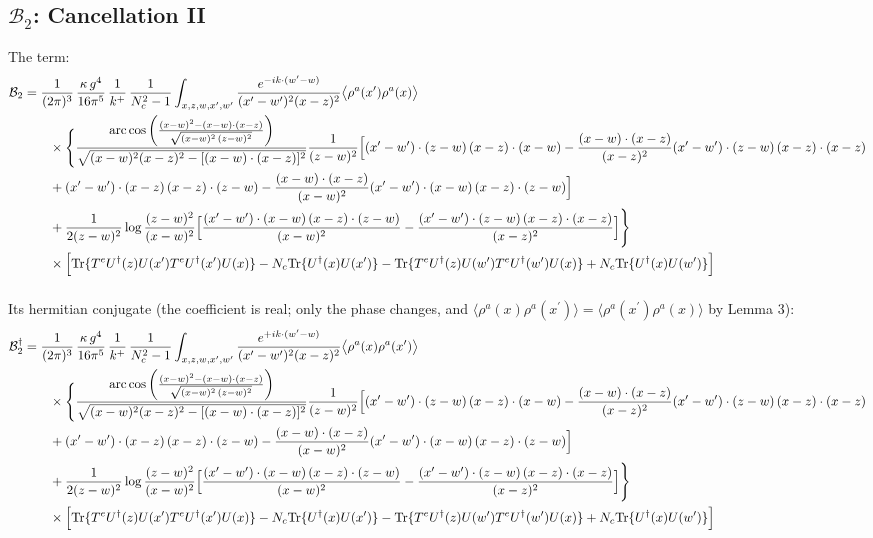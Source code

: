 \documentclass[10pt]{article}
\begin{document}
\subsection*{$\mathcal{B}_{2}$: Cancellation II}
\noindent The term:
\begin{align}
\mathcal{B}_{2}&=\frac{1}{(2\pi)^{3}}\,\frac{\kappa\,g^{4}}{16\pi^{5}}\,\frac{1}{k^{+}}\,\frac{1}{N_{c}^{2}-1}\int_{x,z,w,x',w'}\frac{e^{-ik\cdot(w'-w)}}{(x'-w')^{2}(x-z)^{2}}\big\langle\rho^{a}(x')\rho^{a}(x)\big\rangle\notag\\
&\qquad\times\Bigg\{\frac{\mathrm{arc\,cos}\left(\frac{(x-w)^{2}-(x-w)\cdot (x-z)}{\sqrt{(x-w)^{2}\,(z-w)^{2}}}\right)}{\sqrt{(x-w)^{2}(x-z)^{2}-[(x-w)\cdot(x-z)]^{2}}}\frac{1}{(z-w)^{2}}\Big[(x'-w')\cdot(z-w)\,(x-z)\cdot(x-w)-\frac{(x-w)\cdot(x-z)}{(x-z)^{2}}(x'-w')\cdot(z-w)\,(x-z)\cdot(x-z)\notag\\
&\qquad+(x'-w')\cdot(x-z)\,(x-z)\cdot(z-w)-\frac{(x-w)\cdot(x-z)}{(x-w)^{2}}(x'-w')\cdot(x-w)\,(x-z)\cdot(z-w)\Big]\notag\\
&\qquad+\frac{1}{2(z-w)^{2}}\log\frac{(z-w)^{2}}{(x-w)^{2}}\Big[\frac{(x'-w')\cdot(x-w)\,(x-z)\cdot(z-w)}{(x-w)^{2}}-\frac{(x'-w')\cdot(z-w)\,(x-z)\cdot(x-z)}{(x-z)^{2}}\Big]\Bigg\}\notag\\
&\qquad\times\Big[{\rm Tr}\{T^{e}U^{\dagger}(z)U(x')T^{e}U^{\dagger}(x')U(x)\}-N_{c}{\rm Tr}\{U^{\dagger}(x)U(x')\}-{\rm Tr}\{T^{e}U^{\dagger}(z)U(w')T^{e}U^{\dagger}(w')U(x)\}+N_{c}{\rm Tr}\{U^{\dagger}(x)U(w')\}\Big]\notag\\[6pt]
\end{align}

\noindent Its hermitian conjugate (the coefficient is real; only the phase changes, and $\langle\rho^{a}(x)\rho^{a}(x^{\prime})\rangle=\langle\rho^{a}(x^{\prime})\rho^{a}(x)\rangle$ by Lemma 3):
\begin{align}
\mathcal{B}_{2}^{\dagger}&=\frac{1}{(2\pi)^{3}}\,\frac{\kappa\,g^{4}}{16\pi^{5}}\,\frac{1}{k^{+}}\,\frac{1}{N_{c}^{2}-1}\int_{x,z,w,x',w'}\frac{e^{+ik\cdot(w'-w)}}{(x'-w')^{2}(x-z)^{2}}\big\langle\rho^{a}(x)\rho^{a}(x')\big\rangle\notag\\
&\qquad\times\Bigg\{\frac{\mathrm{arc\,cos}\left(\frac{(x-w)^{2}-(x-w)\cdot (x-z)}{\sqrt{(x-w)^{2}\,(z-w)^{2}}}\right)}{\sqrt{(x-w)^{2}(x-z)^{2}-[(x-w)\cdot(x-z)]^{2}}}\frac{1}{(z-w)^{2}}\Big[(x'-w')\cdot(z-w)\,(x-z)\cdot(x-w)-\frac{(x-w)\cdot(x-z)}{(x-z)^{2}}(x'-w')\cdot(z-w)\,(x-z)\cdot(x-z)\notag\\
&\qquad+(x'-w')\cdot(x-z)\,(x-z)\cdot(z-w)-\frac{(x-w)\cdot(x-z)}{(x-w)^{2}}(x'-w')\cdot(x-w)\,(x-z)\cdot(z-w)\Big]\notag\\
&\qquad+\frac{1}{2(z-w)^{2}}\log\frac{(z-w)^{2}}{(x-w)^{2}}\Big[\frac{(x'-w')\cdot(x-w)\,(x-z)\cdot(z-w)}{(x-w)^{2}}-\frac{(x'-w')\cdot(z-w)\,(x-z)\cdot(x-z)}{(x-z)^{2}}\Big]\Bigg\}\notag\\
&\qquad\times\Big[{\rm Tr}\{T^{e}U^{\dagger}(z)U(x')T^{e}U^{\dagger}(x')U(x)\}-N_{c}{\rm Tr}\{U^{\dagger}(x)U(x')\}-{\rm Tr}\{T^{e}U^{\dagger}(z)U(w')T^{e}U^{\dagger}(w')U(x)\}+N_{c}{\rm Tr}\{U^{\dagger}(x)U(w')\}\Big]\notag\\[6pt]
\end{align}
\end{document}
